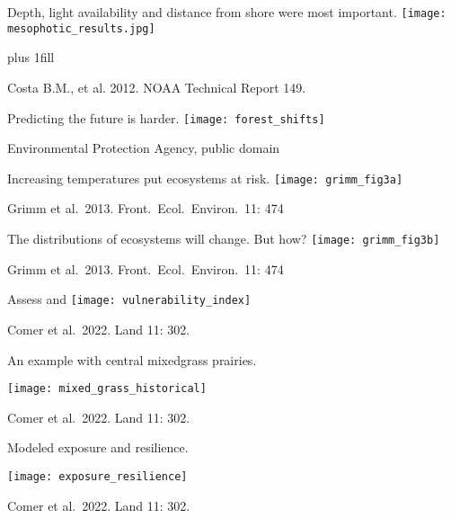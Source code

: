 \documentclass[t]{beamer}
\begin{document}
\begin{frame}[t,plain]{Depth, light availability and distance from shore were most important.}
	\centering%
		\texttt{[image: mesophotic\_results.jpg]}\par

	\vskip0pt plus 1fill

\hfill\tiny Costa B.M., et al. 2012. NOAA Technical Report 149.
\end{frame}

\begin{frame}{Predicting the future is harder.}
\texttt{[image: forest\_shifts]}

\tinyfill Environmental Protection Agency, public domain
\end{frame}

\begin{frame}{Increasing temperatures put ecosystems at risk.}
\texttt{[image: grimm\_fig3a]}

\tinyfill Grimm et al.\ 2013. Front.\ Ecol.\ Environ.\ 11: 474
\end{frame}

\begin{frame}{The distributions of ecosystems will change. But how?}
\texttt{[image: grimm\_fig3b]}

\tinyfill Grimm et al.\ 2013. Front.\ Ecol.\ Environ.\ 11: 474
\end{frame}

\begin{frame}{Assess  and }
\centering
\texttt{[image: vulnerability\_index]}

\tinyfill Comer et al.\ 2022. Land 11: 302.
\end{frame}

\begin{frame}{An example with central mixedgrass prairies.}

\texttt{[image: mixed\_grass\_historical]}


\tinyfill Comer et al.\ 2022. Land 11: 302.
\end{frame}

\begin{frame}{Modeled exposure and resilience.}

\texttt{[image: exposure\_resilience]}

\tinyfill Comer et al.\ 2022. Land 11: 302.
\end{frame}
\end{document}
